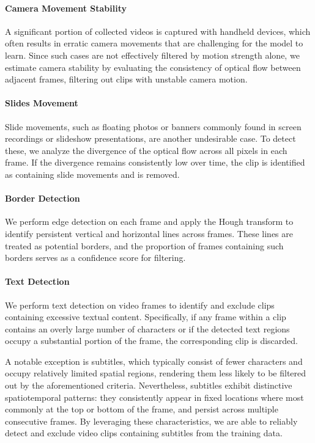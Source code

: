 \paragraph{Camera Movement Stability}
A significant portion of collected videos is captured with handheld devices, which often results in erratic camera movements that are challenging for the model to learn. Since such cases are not effectively filtered by motion strength alone, we estimate camera stability by evaluating the consistency of optical flow between adjacent frames, filtering out clips with unstable camera motion.

\paragraph{Slides Movement}
Slide movements, such as floating photos or banners commonly found in screen recordings or slideshow presentations, are another undesirable case. To detect these, we analyze the divergence of the optical flow across all pixels in each frame. If the divergence remains consistently low over time, the clip is identified as containing slide movements and is removed.

\paragraph{Border Detection}
We perform edge detection on each frame and apply the Hough transform to identify persistent vertical and horizontal lines across frames. These lines are treated as potential borders, and the proportion of frames containing such borders serves as a confidence score for filtering.

\paragraph{Text Detection}
We perform text detection on video frames to identify and exclude clips containing excessive textual content. Specifically, if any frame within a clip contains an overly large number of characters or if the detected text regions occupy a substantial portion of the frame, the corresponding clip is discarded.

A notable exception is subtitles, which typically consist of fewer characters and occupy relatively limited spatial regions, rendering them less likely to be filtered out by the aforementioned criteria. Nevertheless, subtitles exhibit distinctive spatiotemporal patterns: they consistently appear in fixed locations where most commonly at the top or bottom of the frame, and persist across multiple consecutive frames. By leveraging these characteristics, we are able to reliably detect and exclude video clips containing subtitles from the training data.

